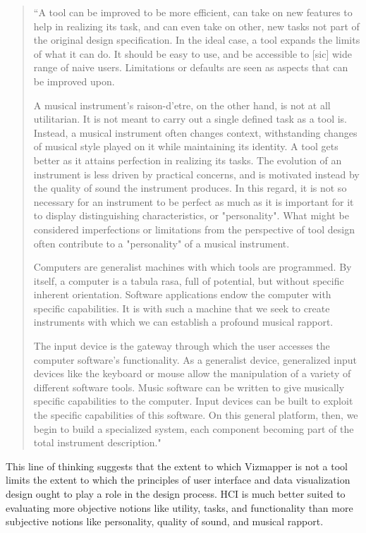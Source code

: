 \begin{quote}
``A tool can be improved to be more efficient, can take on new features to help in realizing its task, and can even take on other, new tasks not part of the original design specification. In the ideal case, a tool expands the limits of what it can do. It should be easy to use, and be accessible to [sic] wide range of naive users. Limitations or defaults are seen as aspects that can be improved upon.

A musical instrument's raison-d'etre, on the other hand, is not at all utilitarian. It is not meant to carry out a single defined task as a tool is. Instead, a musical instrument often changes context, withstanding changes of musical style played on it while maintaining its identity. A tool gets better as it attains perfection in realizing its tasks. The evolution of an instrument is less driven by practical concerns, and is motivated instead by the quality of sound the instrument produces. In this regard, it is not so necessary for an instrument to be perfect as much as it is important for it to display distinguishing characteristics, or "personality". What might be considered imperfections or limitations from the perspective of tool design often contribute to a "personality" of a musical instrument.

Computers are generalist machines with which tools are programmed. By itself, a computer is a tabula rasa, full of potential, but without specific inherent orientation. Software applications endow the computer with specific capabilities. It is with such a machine that we seek to create instruments with which we can establish a profound musical rapport.

The input device is the gateway through which the user accesses the computer software's functionality. As a generalist device, generalized input devices like the keyboard or mouse allow the manipulation of a variety of different software tools. Music software can be written to give musically specific capabilities to the computer. Input devices can be built to exploit the specific capabilities of this software. On this general platform, then, we begin to build a specialized system, each component becoming part of the total instrument description." 
\end{quote}

This line of thinking suggests that the extent to which Vizmapper is not a tool limits the extent to which the principles of user interface and data visualization design ought to play a role in the design process. HCI is much better suited to evaluating more objective notions like utility, tasks, and functionality than more subjective notions like personality, quality of sound, and musical rapport.

